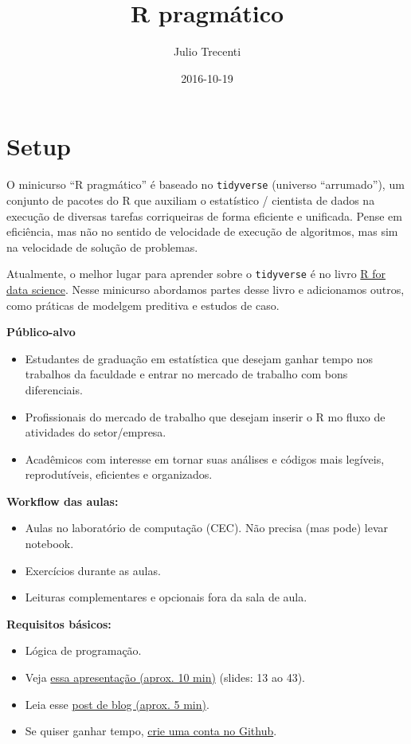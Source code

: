 \documentclass[]{book}
\title{R pragmático}
\author{Julio Trecenti}
\date{2016-10-19}
\providecommand{\tightlist}{%
  \setlength{\itemsep}{0pt}\setlength{\parskip}{0pt}}
\begin{document}
\maketitle

{
\setcounter{tocdepth}{1}
\tableofcontents
}
\chapter{Setup}\label{setup}

O minicurso ``R pragmático'' é baseado no \texttt{tidyverse} (universo
``arrumado''), um conjunto de pacotes do R que auxiliam o estatístico /
cientista de dados na execução de diversas tarefas corriqueiras de forma
eficiente e unificada. Pense em eficiência, mas não no sentido de
velocidade de execução de algoritmos, mas sim na velocidade de solução
de problemas.

Atualmente, o melhor lugar para aprender sobre o \texttt{tidyverse} é no
livro \href{http://r4ds.had.co.nz/}{R for data science}. Nesse minicurso
abordamos partes desse livro e adicionamos outros, como práticas de
modelgem preditiva e estudos de caso.

\textbf{Público-alvo}

\begin{itemize}
\tightlist
\item
  Estudantes de graduação em estatística que desejam ganhar tempo nos
  trabalhos da faculdade e entrar no mercado de trabalho com bons
  diferenciais.
\item
  Profissionais do mercado de trabalho que desejam inserir o R mo fluxo
  de atividades do setor/empresa.
\item
  Acadêmicos com interesse em tornar suas análises e códigos mais
  legíveis, reprodutíveis, eficientes e organizados.
\end{itemize}

\textbf{Workflow das aulas:}

\begin{itemize}
\tightlist
\item
  Aulas no laboratório de computação (CEC). Não precisa (mas pode) levar
  notebook.
\item
  Exercícios durante as aulas.
\item
  Leituras complementares e opcionais fora da sala de aula.
\end{itemize}

\textbf{Requisitos básicos:}

\begin{itemize}
\tightlist
\item
  Lógica de programação.
\item
  Veja
  \href{http://curso-r.github.io/slides/aula_00_01_apresentacao.html}{essa
  apresentação (aprox. 10 min)} (slides: 13 ao 43).
\item
  Leia esse
  \href{https://blog.rstudio.org/2016/09/15/tidyverse-1-0-0/}{post de
  blog (aprox. 5 min)}.
\item
  Se quiser ganhar tempo, \href{http://github.com}{crie uma conta no
  Github}.
\end{itemize}
\end{document}
